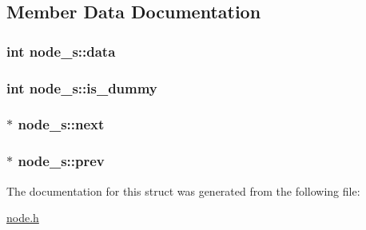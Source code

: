 \subsection{Member Data Documentation}
\hypertarget{structnode__s_a9eeca3bba8c141ccc40edb205d898c5a}{
\subsubsection[{data}]{\setlength{\rightskip}{0pt plus 5cm}int node\-\_\-s\-::data}}\label{structnode__s_a9eeca3bba8c141ccc40edb205d898c5a}
\hypertarget{structnode__s_aa299569154c5d785262de31caf489f84}{
\subsubsection[{is\-\_\-dummy}]{\setlength{\rightskip}{0pt plus 5cm}int node\-\_\-s\-::is\-\_\-dummy}}\label{structnode__s_aa299569154c5d785262de31caf489f84}
\hypertarget{structnode__s_a5a6b703d87cda099a7dc7dc1dbcae9d7}{
\subsubsection[{next}]{$\ast$ node\-\_\-s\-::next}}\label{structnode__s_a5a6b703d87cda099a7dc7dc1dbcae9d7}
\hypertarget{structnode__s_af63f2c2c1d16037022a14eacd1abf713}{
\subsubsection[{prev}]{$\ast$ node\-\_\-s\-::prev}}\label{structnode__s_af63f2c2c1d16037022a14eacd1abf713}


The documentation for this struct was generated from the following file\-:\begin{DoxyCompactItemize}
\item 
\hyperlink{node_8h}{node.\-h}\end{DoxyCompactItemize}
